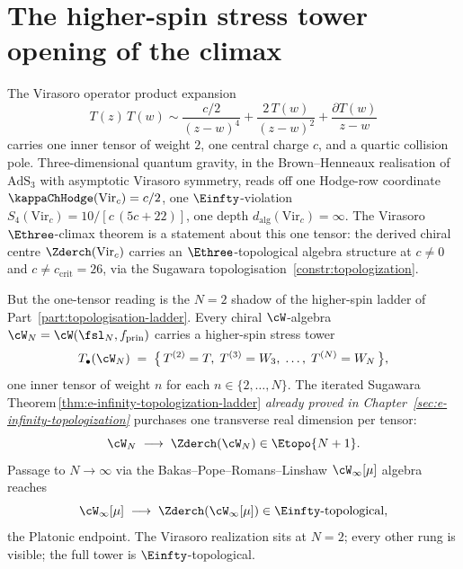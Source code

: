 
\chapter{The higher-spin stress tower opening of the climax}
\label{ch:part-vi-higher-spin-stress-tower-opening}
\label{ch:part-vi-platonic-introduction}%

The Virasoro operator product expansion
\begin{equation}
 T(z)\,T(w) \sim \frac{c/2}{(z-w)^4} + \frac{2\,T(w)}{(z-w)^2}
 + \frac{\partial T(w)}{z-w}
\end{equation}
carries one inner tensor of weight $2$, one central charge $c$, and a
quartic collision pole. Three-dimensional quantum gravity, in the
Brown--Henneaux realisation of $\mathrm{AdS}_3$ with asymptotic
Virasoro symmetry, reads off one Hodge-row coordinate
$\kappaChHodge(\mathrm{Vir}_c) = c/2$, one $\Einfty$-violation
$S_4(\mathrm{Vir}_c) = 10/[c\,(5c+22)]$, one depth
$d_{\mathrm{alg}}(\mathrm{Vir}_c) = \infty$. The Virasoro
$\Ethree$-climax theorem is a statement about this one tensor: the
derived chiral centre $\Zderch(\mathrm{Vir}_c)$ carries an
$\Ethree$-topological algebra structure at $c \ne 0$ and
$c \ne c_{\mathrm{crit}} = 26$, via the Sugawara
topologisation~\ref{constr:topologization}.

But the one-tensor reading is the $N = 2$ shadow of the higher-spin
ladder of Part~\ref{part:topologisation-ladder}. Every chiral $\cW$-algebra
$\cW_N = \cW(\fsl_N, f_{\mathrm{prin}})$ carries a higher-spin stress
tower
\begin{equation}
 T_\bullet(\cW_N) \;=\; \bigl\{\,T^{(2)} = T,\; T^{(3)} = W_3,\;
 \ldots,\; T^{(N)} = W_N \,\bigr\},
 \label{eq:part-vi-wn-tower}
\end{equation}
one inner tensor of weight $n$ for each $n \in \{2, \ldots, N\}$. The
iterated Sugawara
Theorem\,\ref{thm:e-infinity-topologization-ladder}
\emph{already proved in
Chapter~\ref{sec:e-infinity-topologization}} purchases one transverse
real dimension per tensor:
\begin{equation}
 \cW_N \;\longrightarrow\; \Zderch(\cW_N) \in \Etopo{N+1}.
 \label{eq:part-vi-wn-ladder}
\end{equation}
Passage to $N \to \infty$ via the Bakas--Pope--Romans--Linshaw
$\cW_\infty[\mu]$ algebra reaches
\begin{equation}
 \cW_\infty[\mu] \;\longrightarrow\; \Zderch(\cW_\infty[\mu]) \in \Einfty\text{-topological},
 \label{eq:part-vi-winfty-ladder}
\end{equation}
the Platonic endpoint. The Virasoro realization sits at $N=2$; every
other rung is visible; the full tower is $\Einfty$-topological.

